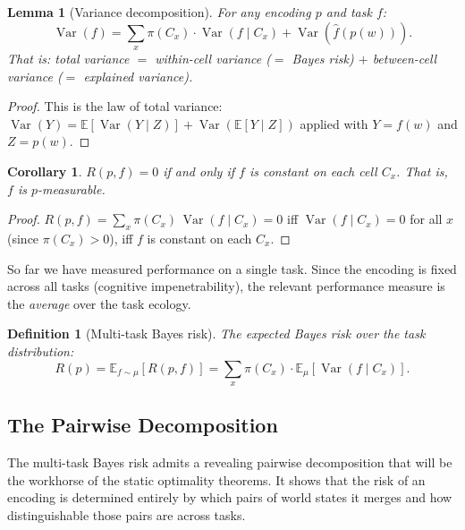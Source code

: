 \documentclass[12pt]{article}
\newtheorem{lemma}[theorem]{Lemma}
\newtheorem{corollary}[theorem]{Corollary}
\newtheorem{definition}[theorem]{Definition}
\newcommand{\E}{\mathbb{E}}
\newcommand{\Var}{\operatorname{Var}}
\begin{document}
\begin{lemma}[Variance decomposition]\label{lem:var-decomp}
For any encoding $p$ and task $f$:
\begin{equation}\label{eq:var-decomp}
\Var(f) = \sum_x \pi(C_x) \cdot \Var(f \mid C_x) + \Var(\hat{f}(p(w))).
\end{equation}
That is: total variance $=$ within-cell variance ($=$ Bayes risk) $+$ between-cell variance ($=$ explained variance).
\end{lemma}

\begin{proof}
This is the law of total variance: $\Var(Y) = \E[\Var(Y \mid Z)] + \Var(\E[Y \mid Z])$ applied with $Y = f(w)$ and $Z = p(w)$.
\end{proof}

\begin{corollary}\label{cor:zero-risk}
$R(p, f) = 0$ if and only if $f$ is constant on each cell $C_x$. That is, $f$ is $p$-measurable.
\end{corollary}

\begin{proof}
$R(p, f) = \sum_x \pi(C_x)\, \Var(f \mid C_x) = 0$ iff $\Var(f \mid C_x) = 0$ for all $x$ (since $\pi(C_x) > 0$), iff $f$ is constant on each $C_x$.
\end{proof}

So far we have measured performance on a single task. Since the encoding is fixed across all tasks (cognitive impenetrability), the relevant performance measure is the \emph{average} over the task ecology.

\begin{definition}[Multi-task Bayes risk]\label{def:multi-risk}
The expected Bayes risk over the task distribution:
\begin{equation}\label{eq:multi-risk}
R(p) = \E_{f \sim \mu}[R(p, f)] = \sum_x \pi(C_x) \cdot \E_\mu[\Var(f \mid C_x)].
\end{equation}
\end{definition}

\subsection{The Pairwise Decomposition}\label{sec:pairwise}

The multi-task Bayes risk admits a revealing pairwise decomposition that will be the workhorse of the static optimality theorems. It shows that the risk of an encoding is determined entirely by which pairs of world states it merges and how distinguishable those pairs are across tasks.
\end{document}
